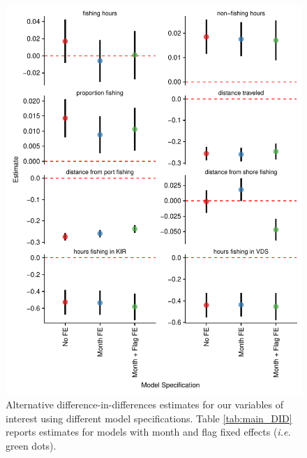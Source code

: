 \documentclass[9p,twocolumn,twoside,lineno]{pnas-new}
\begin{document}
\begin{figure}
\centering
\includegraphics{img/other_specifications.pdf}
\caption{\label{fig:other_specifications}Alternative difference-in-differences estimates
for our variables of interest using different model specifications. Table \ref{tab:main_DID}
reports estimates for models with month and flag fixed effects (\emph{i.e.} green dots).}
\end{figure}

\clearpage
\end{document}
